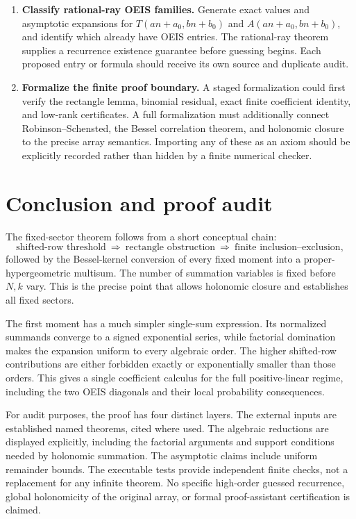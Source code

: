 \documentclass[11pt,letterpaper]{article}
\numberwithin{equation}{section}
\theoremstyle{definition}
\begin{document}
\begin{enumerate}[leftmargin=*,itemsep=8pt]
\item \textbf{Classify rational-ray OEIS families.}
Generate exact values and asymptotic expansions for
$T(an+a_0,bn+b_0)$ and $A(an+a_0,bn+b_0)$, and identify which already
have OEIS entries. The rational-ray theorem supplies a recurrence
existence guarantee before guessing begins. Each proposed entry or
formula should receive its own source and duplicate audit.

\item \textbf{Formalize the finite proof boundary.}
A staged formalization could first verify the rectangle lemma,
binomial residual, exact finite coefficient identity, and low-rank
certificates. A full formalization must additionally connect
Robinson--Schensted, the Bessel correlation theorem, and holonomic
closure to the precise array semantics. Importing any of these as
an axiom should be explicitly recorded rather than hidden by a
finite numerical checker.
\end{enumerate}

\section{Conclusion and proof audit}
The fixed-sector theorem follows from a short conceptual chain:
\[
 \text{shifted-row threshold}
 \ \Longrightarrow\ \text{rectangle obstruction}
 \ \Longrightarrow\ \text{finite inclusion--exclusion},
\]
followed by the Bessel-kernel conversion of every fixed moment into a
proper-hypergeometric multisum. The number of summation variables is
fixed before $N,k$ vary. This is the precise point that allows
holonomic closure and establishes all fixed sectors.

The first moment has a much simpler single-sum expression. Its
normalized summands converge to a signed exponential series, while
factorial domination makes the expansion uniform to every algebraic
order. The higher shifted-row contributions are either forbidden
exactly or exponentially smaller than those orders. This gives a
single coefficient calculus for the full positive-linear regime,
including the two OEIS diagonals and their local probability
consequences.

For audit purposes, the proof has four distinct layers. The external
inputs are established named theorems, cited where used. The algebraic
reductions are displayed explicitly, including the factorial arguments
and support conditions needed by holonomic summation. The asymptotic
claims include uniform remainder bounds. The executable tests provide
independent finite checks, not a replacement for any infinite theorem.
No specific high-order guessed recurrence, global holonomicity of the
original array, or formal proof-assistant certification is claimed.
\end{document}
